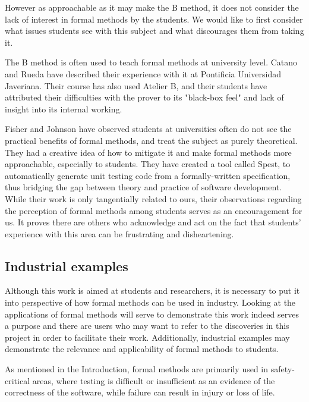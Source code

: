 \documentclass[12pt,journal,duplex]{IEEEtran}
\begin{document}
	However as approachable as it may make the B method, it does not consider the lack of interest in formal methods by the students. We would like to first consider what issues students see with this subject and what discourages them from taking it.
	
	The B method is often used to teach formal methods at university level. Catano and Rueda have described their experience with it at Pontificia Universidad Javeriana. Their course has also used Atelier B, and their students have attributed their difficulties with the prover to its "black-box feel" and lack of insight into its internal working.\cite{teaching}

	Fisher and Johnson have observed students at universities often do not see the practical benefits of formal methods, and treat the subject as purely theoretical.\cite{test generation} They had a creative idea of how to mitigate it and make formal methods more approachable, especially to students. They have created a tool called Spest, to automatically generate unit testing code from a formally-written specification, thus bridging the gap between theory and practice of software development. While their work is only tangentially related to ours, their observations regarding the perception of formal methods among students serves as an encouragement for us. It proves there are others who acknowledge and act on the fact that students' experience with this area can be frustrating and disheartening.



	\subsection{Industrial examples}
	Although this work is aimed at students and researchers, it is necessary to put it into perspective of how formal methods can be used in industry. Looking at the applications of formal methods will serve to demonstrate this work indeed serves a purpose and there are users who may want to refer to the discoveries in this project in order to facilitate their work. Additionally, industrial examples may demonstrate the relevance and applicability of formal methods to students.

	As mentioned in the Introduction, formal methods are primarily used in safety-critical areas, where testing is difficult or insufficient as an evidence of the correctness of the software, while failure can result in injury or loss of life.
\end{document}
